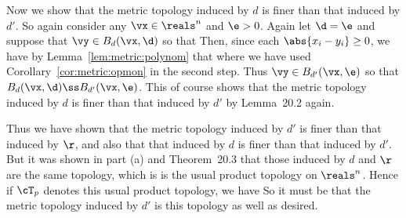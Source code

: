 {  Now we show that the metric topology induced by $d$ is finer than that induced by $d'$.
  So again consider any $\vx \in \reals^n$ and $\e > 0$.
  Again let $\d = \e$ and suppose that $\vy \in B_d(\vx, \d)$ so that
  Then, since each $\abs{x_i - y_i} \geq 0$, we have by Lemma~\ref{lem:metric:polynom} that
  where we have used Corollary~\ref{cor:metric:opmon} in the second step.
  Thus $\vy \in B_{d'}(\vx, \e)$ so that $B_d(\vx, \d) \ss B_{d'}(\vx, \e)$.
  This of course shows that the metric topology induced by $d$ is finer than that induced by $d'$ by Lemma~20.2 again.

  Thus we have shown that the metric topology induced by $d'$ is finer than that induced by $\r$, and also that that induced by $d$ is finer than that induced by $d'$.
  But it was shown in part (a) and Theorem~20.3 that those induced by $d$ and $\r$ are the same topology, which is is the usual product topology on $\reals^n$.
  Hence if $\cT_p$ denotes this usual product topology, we have
  So it must be that the metric topology induced by $d'$ is this topology as well as desired.
}



